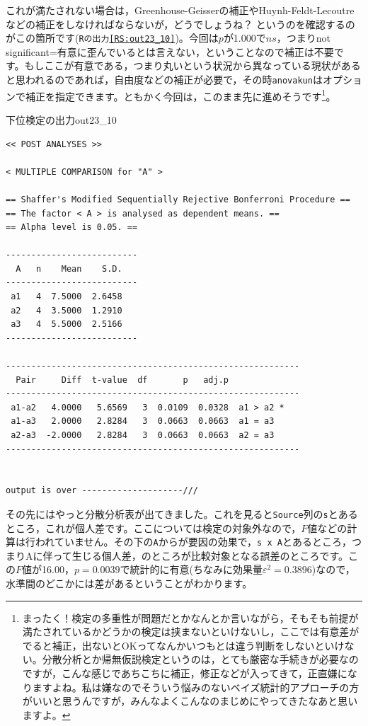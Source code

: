 \documentclass{ltjbook}
\begin{document}
これが満たされない場合は，Greenhouse-Geisserの補正やHuynh-Feldt-Lecoutreなどの補正をしなければならないが，どうでしょうね？ というのを確認するのがこの箇所です(\texttt{Rの出力\ref{RS:out23_10}})。今回は$p$が1.000で$ns$，つまりnot significant=有意に歪んでいるとは言えない，ということなので補正は不要です。もしここが有意である，つまり丸いという状況から異なっている現状があると思われるのであれば，自由度などの補正が必要で，その時\texttt{anovakun}はオプションで補正を指定できます。ともかく今回は，このまま先に進めそうです\footnote{まったく！検定の多重性が問題だとかなんとか言いながら，そもそも前提が満たされているかどうかの検定は挟まないといけないし，ここでは有意差がでると補正，出ないとOKってなんかいつもとは違う判断をしないといけない。分散分析とか帰無仮説検定というのは，とても厳密な手続きが必要なのですが，こんな感じであちこちに補正，修正などが入ってきて，正直嫌になりますよね。私は嫌なのでそういう悩みのないベイズ統計的アプローチの方がいいと思うんですが，みんなよくこんなのまじめにやってきたなあと思いますよ。}。
\begin{Rscreen}{下位検定の出力}{out23_10}

	\begin{verbatim}
<< POST ANALYSES >>

< MULTIPLE COMPARISON for "A" >

== Shaffer's Modified Sequentially Rejective Bonferroni Procedure ==
== The factor < A > is analysed as dependent means. == 
== Alpha level is 0.05. == 
 
--------------------------
  A   n    Mean    S.D. 
--------------------------
 a1   4  7.5000  2.6458 
 a2   4  3.5000  1.2910 
 a3   4  5.5000  2.5166 
--------------------------

----------------------------------------------------------
  Pair     Diff  t-value  df       p   adj.p            
----------------------------------------------------------
 a1-a2   4.0000   5.6569   3  0.0109  0.0328  a1 > a2 * 
 a1-a3   2.0000   2.8284   3  0.0663  0.0663  a1 = a3   
 a2-a3  -2.0000   2.8284   3  0.0663  0.0663  a2 = a3   
----------------------------------------------------------


output is over --------------------///

\end{verbatim}
\end{Rscreen}
その先にはやっと分散分析表が出てきました。これを見ると\texttt{Source}列の\texttt{s}とあるところ，これが個人差です。ここについては検定の対象外なので，$F$値などの計算は行われていません。その下の\texttt{A}からが要因の効果で，\texttt{s x A}とあるところ，つまりAに伴って生じる個人差，のところが比較対象となる誤差のところです。この$F$値が16.00，$p=0.0039$で統計的に有意(ちなみに効果量$\varepsilon^2=0.3896$)なので，水準間のどこかには差があるということがわかります。
\end{document}
